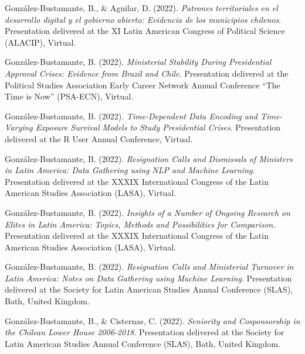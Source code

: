 \begin{publications}
\begin{benumerate}{87}
\item{González-Bustamante, B., \& Aguilar, D. (2022). {\itshape Patrones territoriales en el desarrollo digital y el gobierno abierto: Evidencia de los municipios chilenos}. Presentation delivered at the XI Latin American Congress of Political Science (ALACIP), Virtual.}\vspace{1mm}

\item{González-Bustamante, B. (2022). {\itshape Ministerial Stability During Presidential Approval Crises: Evidence from Brazil and Chile}. Presentation delivered at the Political Studies Association Early Career Network Annual Conference ``The Time is Now'' (PSA-ECN), Virtual.}\vspace{1mm}

\item{González-Bustamante, B. (2022). {\itshape Time-Dependent Data Encoding and Time-Varying Exposure Survival Models to Study Presidential Crises}. Presentation delivered at the R User Annual Conference, Virtual.}\vspace{1mm}

\item{González-Bustamante, B. (2022). {\itshape Resignation Calls and Dismissals of Ministers in Latin America: Data Gathering using NLP and Machine Learning}. Presentation delivered at the XXXIX International Congress of the Latin American Studies Association (LASA), Virtual.}\vspace{1mm}

\item{González-Bustamante, B. (2022). {\itshape Insights of a Number of Ongoing Research on Elites in Latin America: Topics, Methods and Possibilities for Comparison}. Presentation delivered at the XXXIX International Congress of the Latin American Studies Association (LASA), Virtual.}\vspace{1mm}

\item{González-Bustamante, B. (2022). {\itshape Resignation Calls and Ministerial Turnover in Latin America: Notes on Data Gathering using Machine Learning}. Presentation delivered at the Society for Latin American Studies Annual Conference (SLAS), Bath, United Kingdom.}\vspace{1mm}

\item{González-Bustamante, B., \& Cisternas, C. (2022). {\itshape Seniority and Cosponsorship in the Chilean Lower House 2006-2018}. Presentation delivered at the Society for Latin American Studies Annual Conference (SLAS), Bath, United Kingdom.}\vspace{1mm}


\end{benumerate}
\end{publications}
